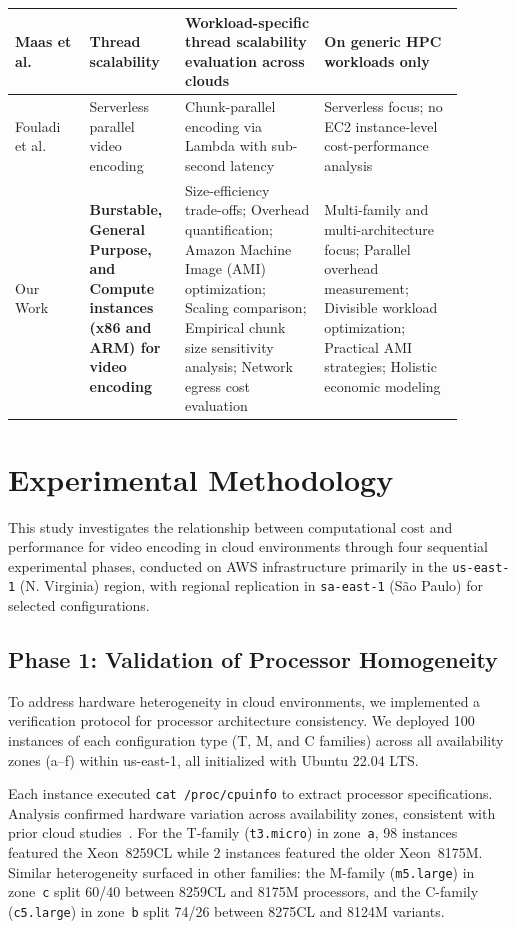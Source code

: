 \documentclass[conference]{IEEEtran}
\begin{document}
\begin{table}[!htbp]
\begin{tabular}{|p{0.15\linewidth}|p{0.18\linewidth}|p{0.28\linewidth}|p{0.28\linewidth}|}
		\hline
		Maas et al. \cite{b23} & Thread scalability & Workload-specific thread scalability evaluation across clouds & On generic HPC workloads only \\
		\hline
		Fouladi et al. \cite{excamera} & Serverless parallel video encoding & Chunk-parallel encoding via Lambda with sub-second latency & Serverless focus; no EC2 instance-level cost-performance analysis \\
		\hline
		Our Work & \textbf{Burstable, General Purpose, and Compute instances (x86 and ARM) for video encoding} & Size-efficiency trade-offs; Overhead quantification; Amazon Machine Image (AMI) optimization; Scaling comparison; Empirical chunk size sensitivity analysis; Network egress cost evaluation & Multi-family and multi-architecture focus; Parallel overhead measurement; Divisible workload optimization; Practical AMI strategies; Holistic economic modeling \\
		\hline
	\end{tabular}
\end{table}

\section{Experimental Methodology}
\label{met}

This study investigates the relationship between computational cost and
performance for video encoding in cloud environments through four sequential
experimental phases, conducted on AWS infrastructure primarily in the \texttt{us-east-1} (N. Virginia) region, with regional replication in \texttt{sa-east-1} (São Paulo) for selected configurations.

\subsection{Phase 1: Validation of Processor Homogeneity}

To address hardware heterogeneity in cloud environments, we implemented a
verification protocol for processor architecture consistency. We deployed 100
instances of each configuration type (T, M, and C families) across all
availability zones (a--f) within us-east-1, all initialized with Ubuntu 22.04
LTS.

Each instance executed \texttt{cat /proc/cpuinfo} to extract processor
specifications. Analysis confirmed hardware variation across availability
zones, consistent with prior cloud studies~\cite{b2, b5, b6, b7}. For the
T-family (\texttt{t3.micro}) in zone~\texttt{a}, 98 instances featured the
Xeon~8259CL while 2 instances featured the older Xeon~8175M. Similar
heterogeneity surfaced in other families: the M-family (\texttt{m5.large}) in
zone~\texttt{c} split 60/40 between 8259CL and 8175M processors, and the
C-family (\texttt{c5.large}) in zone~\texttt{b} split 74/26 between 8275CL
and 8124M variants.
\end{document}
